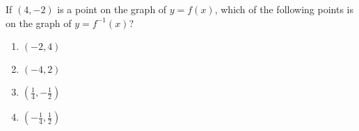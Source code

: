 \bigskip


\item If $(4,-2)$ is a point on the graph of $y=f(x)$, which of the following points is on the graph of $y=f^{-1}(x)$?

    \begin{enumerate}
    \item $(-2,4)$
    \item $(-4,2)$
    \item $(\frac{1}{4},-\frac{1}{2})$
    \item $(-\frac{1}{4},\frac{1}{2})$
    \end{enumerate}

